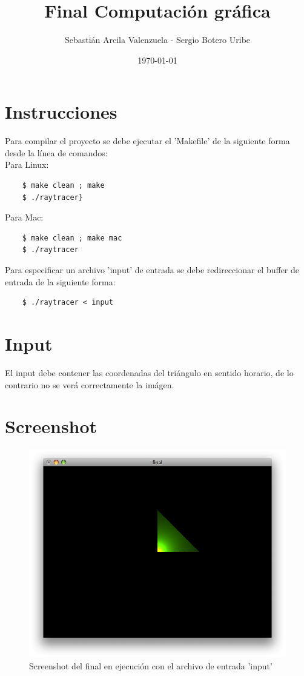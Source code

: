 \documentclass[]{article}
\title{Final Computación gráfica}
\author{ Sebastián Arcila Valenzuela - Sergio Botero Uribe }
\date{\today}
\begin{document}
\pagestyle{empty}

\ifpdf
{}
\else
{}
\fi

\maketitle


\section*{Instrucciones}
Para compilar el proyecto se debe ejecutar el 'Makefile' de la siguiente forma desde la línea de comandos:  \\ Para Linux:
	\begin{center}
	\begin{verbatim}
	$ make clean ; make
	$ ./raytracer} 
	\end{verbatim}
	\end{center}
Para Mac:
\begin{verbatim}
	$ make clean ; make mac
	$ ./raytracer 
\end{verbatim}
Para especificar un archivo 'input' de entrada se debe redireccionar el buffer de entrada de la siguiente forma:
\begin{verbatim}
	$ ./raytracer < input 
\end{verbatim}
\section*{Input}
El input debe contener las coordenadas del triángulo en sentido horario, de lo contrario no se verá correctamente la imágen.

\section*{Screenshot}


\begin{figure}%
   \centering
   \includegraphics[width=6in]{Picture.png} 
   \caption{Screenshot del final en ejecución con el archivo de entrada 'input'}
   \label{fig:example}
\end{figure}



\end{document}
